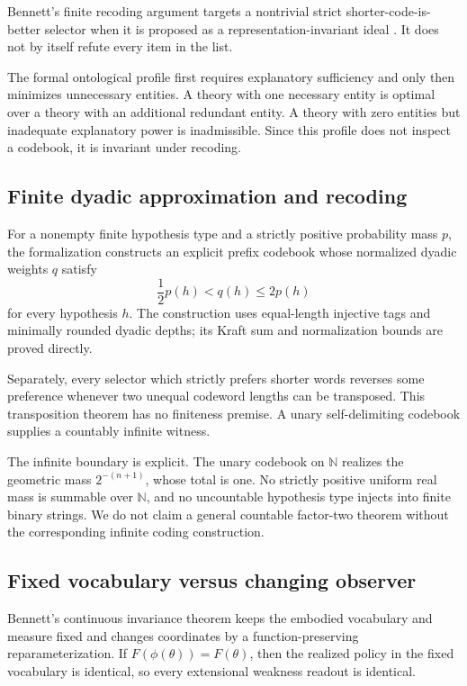 \documentclass[11pt]{article}
\theoremstyle{remark}
\begin{document}
Bennett's finite recoding argument targets a nontrivial strict
shorter-code-is-better selector when it is proposed as a
representation-invariant ideal \cite{bennett2026}.  It does not by itself
refute every item in the list.

The formal ontological profile first requires explanatory sufficiency and only
then minimizes unnecessary entities.  A theory with one necessary entity is
optimal over a theory with an additional redundant entity.  A theory with zero
entities but inadequate explanatory power is inadmissible.  Since this profile
does not inspect a codebook, it is invariant under recoding.

\subsection{Finite dyadic approximation and recoding}

For a nonempty finite hypothesis type and a strictly positive probability mass
$p$, the formalization constructs an explicit prefix codebook whose normalized
dyadic weights $q$ satisfy
\[
  \frac{1}{2}p(h) < q(h) \leq 2p(h)
\]
for every hypothesis $h$.  The construction uses equal-length injective tags
and minimally rounded dyadic depths; its Kraft sum and normalization bounds are
proved directly.

Separately, every selector which strictly prefers shorter words reverses some
preference whenever two unequal codeword lengths can be transposed.  This
transposition theorem has no finiteness premise.  A unary self-delimiting
codebook supplies a countably infinite witness.

The infinite boundary is explicit.  The unary codebook on $\mathbb N$ realizes
the geometric mass $2^{-(n+1)}$, whose total is one.  No strictly positive
uniform real mass is summable over $\mathbb N$, and no uncountable hypothesis
type injects into finite binary strings.  We do not claim a general countable
factor-two theorem without the corresponding infinite coding construction.

\subsection{Fixed vocabulary versus changing observer}

Bennett's continuous invariance theorem keeps the embodied vocabulary and
measure fixed and changes coordinates by a function-preserving
reparameterization.  If $F(\phi(\theta))=F(\theta)$, then the realized policy in
the fixed vocabulary is identical, so every extensional weakness readout is
identical.
\end{document}
